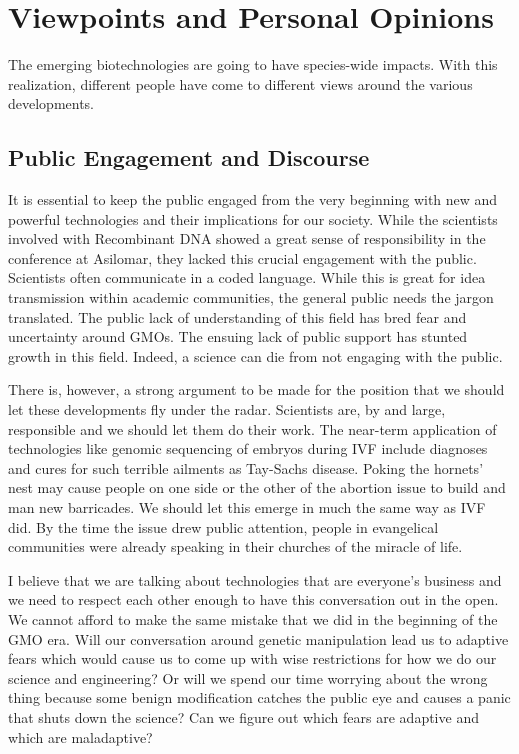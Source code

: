 \section{Viewpoints and Personal Opinions}
\label{sec:viewpoints}

The emerging biotechnologies are going to have species-wide impacts.
With this realization, different people have come to different views around the various developments.

\subsection{Public Engagement and Discourse}

It is essential to keep the public engaged from the very beginning with new and powerful technologies and their implications for our society.
While the scientists involved with Recombinant DNA showed a great sense of responsibility in the conference at Asilomar, they lacked this crucial engagement with the public.
Scientists often communicate in a coded language.
While this is great for idea transmission within academic communities, the general public needs the jargon translated.
The public lack of understanding of this field has bred fear and uncertainty around GMOs.
The ensuing lack of public support has stunted growth in this field.
Indeed, a science can die from not engaging with the public.

There is, however, a strong argument to be made for the position that we should let these developments fly under the radar.
Scientists are, by and large, responsible and we should let them do their work.
The near-term application of technologies like genomic sequencing of embryos during IVF include diagnoses and cures for such terrible ailments as Tay-Sachs disease.
Poking the hornets' nest may cause people on one side or the other of the abortion issue to build and man new barricades.
We should let this emerge in much the same way as IVF did.
By the time the issue drew public attention, people in evangelical communities were already speaking in their churches of the miracle of life.

I believe that we are talking about technologies that are everyone's business and we need to respect each other enough to have this conversation out in the open.
We cannot afford to make the same mistake that we did in the beginning of the GMO era.
Will our conversation around genetic manipulation lead us to adaptive fears which would cause us to come up with wise restrictions for how we do our science and engineering?
Or will we spend our time worrying about the wrong thing because some benign modification catches the public eye and causes a panic that shuts down the science?
Can we figure out which fears are adaptive and which are maladaptive?


